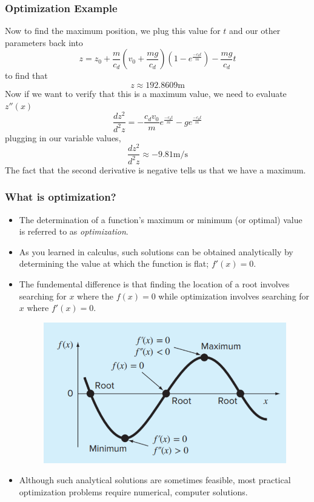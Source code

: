 \documentclass{if-beamer}
\begin{document}
\begin{frame}
	\frametitle{Optimization Example}
	Now to find the maximum position, we plug this value for $t$ and our other parameters back into 
	$$ z = z_0 +\frac{m}{c_d}\left(v_0+\frac{mg}{c_d}\right)\left(1-e^{\frac{-c_dt}{m}}\right) -\frac{mg}{c_d}t $$
	to find that 
	$$ z \approx 192.8609 \textrm{m}$$
	Now if we want to verify that this is a maximum value, we need to evaluate $z''(x)$
	$$\frac{dz^2}{d^2z} = -\frac{c_dv_0}{m}e^{\frac{-c_dt}{m}} -ge^{\frac{-c_dt}{m}}$$
	plugging in our variable values, 
	$$\frac{dz^2}{d^2z} \approx -9.81 \textrm{m/s}$$
	The fact that the second derivative is negative tells us that we have a maximum. 
\end{frame}

\begin{frame}[t]
	\frametitle{What is optimization?}
	\begin{itemize}
		\item The determination of a function's maximum or minimum (or optimal) value is referred to as \textit{optimization}.
		\item  As you learned in calculus, such solutions can be obtained analytically by determining the value at which the function is flat; $f'(x) = 0$.
		\item The fundemental difference is that finding the location of a root  involves searching for $x$ where the $f(x) = 0$ while optimization involves searching for $x$ where $f'(x) = 0$.
		\begin{figure}
			\centering
			\includegraphics[width=.4\textwidth]{figures/optimavsroot}
		\end{figure}
		\item Although such analytical solutions are sometimes feasible, most practical optimization problems require numerical, computer solutions.
	\end{itemize}
\end{frame}
\end{document}
